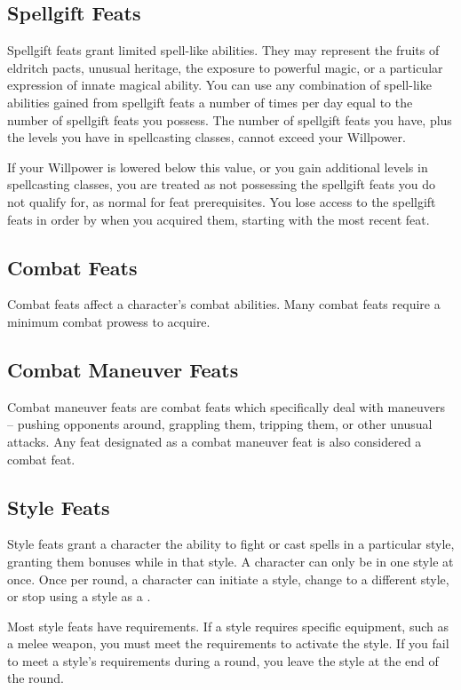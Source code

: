     \subsection{Spellgift Feats}
        Spellgift feats grant limited spell-like abilities.
        They may represent the fruits of eldritch pacts, unusual heritage, the exposure to powerful magic, or a particular expression of innate magical ability.
        You can use any combination of spell-like abilities gained from spellgift feats a number of times per day equal to the number of spellgift feats you possess.
        The number of spellgift feats you have, plus the levels you have in spellcasting classes, cannot exceed your Willpower.

        If your Willpower is lowered below this value, or you gain additional levels in spellcasting classes, you are treated as not possessing the spellgift feats you do not qualify for, as normal for feat prerequisites.
        You lose access to the spellgift feats in order by when you acquired them, starting with the most recent feat.

    \subsection{Combat Feats}
        Combat feats affect a character's combat abilities.
        Many combat feats require a minimum combat prowess to acquire.

    \subsection{Combat Maneuver Feats}
        Combat maneuver feats are combat feats which specifically deal with maneuvers -- pushing opponents around, grappling them, tripping them, or other unusual attacks.
        Any feat designated as a combat maneuver feat is also considered a combat feat.

    \subsection{Style Feats}\label{Style Feats}
        Style feats grant a character the ability to fight or cast spells in a particular style, granting them bonuses while in that style.
        A character can only be in one style at once.
        Once per round, a character can initiate a style, change to a different style, or stop using a style as a .

        Most style feats have requirements.
        If a style requires specific equipment, such as a melee weapon, you must meet the requirements to activate the style.
        If you fail to meet a style's requirements during a round, you leave the style at the end of the round.

